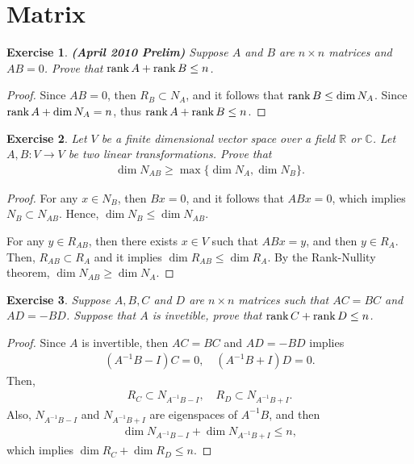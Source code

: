 \documentclass[11pt]{book}
\newtheorem{exercise}{Exercise}[section]
\theoremstyle{definition}
\numberwithin{equation}{chapter}
\begin{document}
\medskip

\section{Matrix}
\begin{exercise}{\bf (April 2010 Prelim)}
Suppose $A$ and $B$ are $n \times n$ matrices and $AB = 0$. Prove that $\rank A + \rank B \leq n$.
\end{exercise}
\begin{proof}
Since $AB = 0$, then $R_B \subset N_A$, and it follows that $\rank B \leq \dim  N_A$. Since $\rank A + \dim  N_A = n$, thus $\rank A + \rank B \leq n$.
\end{proof}

\medskip

\begin{exercise}
Let $V$ be a finite dimensional vector space over a field $\mathbb{R}$ or $\mathbb{C}$. Let $A, B: V \to V$ be two linear transformations. Prove that
\begin{align*}
    \dim  N_{AB} \geq \max\{\dim  N_A, \dim  N_B\}.
\end{align*}
\end{exercise}
\begin{proof}
For any $x \in N_B$, then $Bx = 0$, and it follows that $ABx = 0$, which implies $N_B \subset N_{AB}$. Hence, $\dim  N_B \leq \dim  N_{AB}$.

For any $y \in R_{AB}$, then there exists $x \in V$ such that $ABx = y$, and then $y \in R_A$. Then, $R_{AB} \subset R_A$ and it implies $\dim  R_{AB} \leq \dim  R_A$. By the Rank-Nullity theorem, $\dim  N_{AB} \geq \dim  N_A$.
\end{proof}

\medskip

\begin{exercise}
Suppose $A, B, C$ and $D$ are $n \times n$ matrices such that $AC = BC$ and $AD = - BD$. Suppose that $A$ is invetible, prove that $\rank C + \rank D \leq n$.
\end{exercise}
\begin{proof}
Since $A$ is invertible, then $AC = BC$ and $AD = - BD$ implies
\begin{align*}
    \left(A^{-1} B - I \right)C = 0, \quad \left(A^{-1} B + I \right)D = 0.
\end{align*}
Then, 
\begin{align*}
    R_C \subset N_{A^{-1} B - I}, \quad R_D \subset N_{A^{-1} B + I}.
\end{align*}
Also, $N_{A^{-1} B - I}$ and $N_{A^{-1} B + I}$ are eigenspaces of $A^{-1}B$, and then
\begin{align*}
    \dim  N_{A^{-1} B - I} + \dim  N_{A^{-1} B + I} \leq n,
\end{align*}
which implies $\dim  R_C + \dim  R_D \leq n$.
\end{proof}
\end{document}
